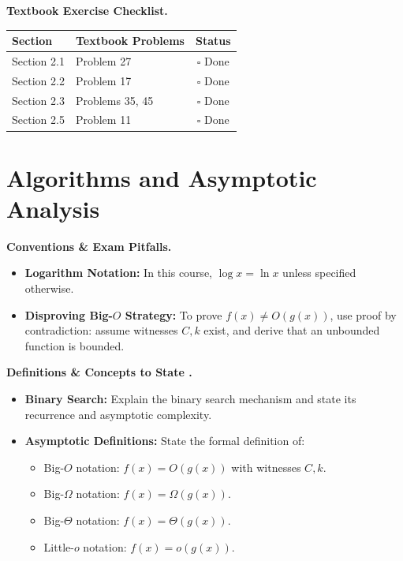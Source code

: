 \documentclass{natsirt}
\newcounter{topic}[section]
\newenvironment{recallbox}[1][]{%
    \begin{bluebox}[#1]\refstepcounter{topic}\textbf{Definitions \& Concepts to State \thesection.\thetopic}%
}{\end{bluebox}}
\newenvironment{warningbox}[1][]{\begin{whitebox}[#1]\textbf{Conventions \& Exam Pitfalls. }}{\end{whitebox}}
\newenvironment{reviewbox}[1][]{\begin{whitebox}[#1]\textbf{Textbook Exercise Checklist. }}{\end{whitebox}}
\newcommand{\citem}{\item[$\square$]}
\begin{document}
\begin{reviewbox}
    \begin{center}
    \begin{tabular}{|l|l|c|}
        \hline
        \textbf{Section} & \textbf{Textbook Problems} & \textbf{Status} \\
        \hline
        Section 2.1 & Problem 27 & $\square$ Done \\
        Section 2.2 & Problem 17 & $\square$ Done \\
        Section 2.3 & Problems 35, 45 & $\square$ Done \\
        Section 2.5 & Problem 11 & $\square$ Done \\
        \hline
    \end{tabular}
    \end{center}
\end{reviewbox}


\section{Algorithms and Asymptotic Analysis}

\begin{warningbox}
    \begin{itemize}
        \citem \textbf{Logarithm Notation:} In this course, $\log x = \ln x$ unless specified otherwise.
        \citem \textbf{Disproving Big-$O$ Strategy:} To prove $f(x) \neq O(g(x))$, use proof by contradiction: assume witnesses $C, k$ exist, and derive that an unbounded function is bounded.
    \end{itemize}
\end{warningbox}

\begin{recallbox}
    \begin{itemize}
        \citem \textbf{Binary Search:} Explain the binary search mechanism and state its recurrence and asymptotic complexity.
        \citem \textbf{Asymptotic Definitions:} State the formal definition of:
        \begin{itemize}
            \item Big-$O$ notation: $f(x) = O(g(x))$ with witnesses $C, k$.
            \item Big-$\Omega$ notation: $f(x) = \Omega(g(x))$.
            \item Big-$\Theta$ notation: $f(x) = \Theta(g(x))$.
            \item Little-$o$ notation: $f(x) = o(g(x))$.
        \end{itemize}
    \end{itemize}
\end{recallbox}
\end{document}
